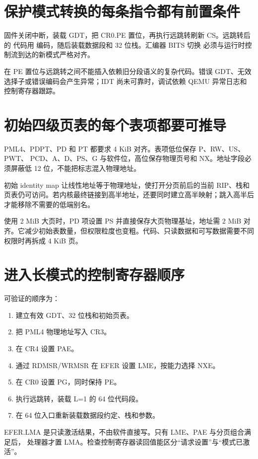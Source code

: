 \section{保护模式转换的每条指令都有前置条件}

固件关闭中断，装载 GDT，把 CR0.PE 置位，再执行远跳转刷新 CS。远跳转后的
代码用  编码，随后装载数据段和 32 位栈。汇编器 BITS 切换
必须与运行时控制流到达的新模式严格对齐。

在 PE 置位与远跳转之间不能插入依赖旧分段语义的复杂代码。错误 GDT、无效
选择子或错误编码会产生异常；IDT 尚未可靠时，调试依赖 QEMU 异常日志和
控制寄存器跟踪。

\section{初始四级页表的每个表项都要可推导}

PML4、PDPT、PD 和 PT 都要求 4 KiB 对齐。表项低位保存 P、RW、US、PWT、
PCD、A、D、PS、G 与软件位，高位保存物理页号和 NX。地址字段必须屏蔽低
12 位，不能把标志混入物理地址。

初始 identity map 让线性地址等于物理地址，使打开分页前后的当前 RIP、栈和
页表仍可访问。若内核最终链接到高半地址，还要同时建立高半映射；跳入高半后
才能移除不需要的低端别名。

使用 2 MiB 大页时，PD 项设置 PS 并直接保存大页物理基址，地址需 2 MiB
对齐。它减少初始表数量，但权限粒度也变粗。代码、只读数据和可写数据需要不同
权限时再拆成 4 KiB 页。

\section{进入长模式的控制寄存器顺序}

可验证的顺序为：

\begin{enumerate}[label=\arabic*.]
  \item 建立有效 GDT、32 位栈和初始页表。
  \item 把 PML4 物理地址写入 CR3。
  \item 在 CR4 设置 PAE。
  \item 通过 RDMSR/WRMSR 在 EFER 设置 LME，按能力选择 NXE。
  \item 在 CR0 设置 PG，同时保持 PE。
  \item 执行远跳转，装载 L=1 的 64 位代码段。
  \item 在 64 位入口重新装载数据段约定、栈和参数。
\end{enumerate}

EFER.LMA 是只读激活结果，不由软件直接写。只有 LME、PAE 与分页组合满足后，
处理器才置 LMA。检查控制寄存器读回值能区分“请求设置”与“模式已激活”。

